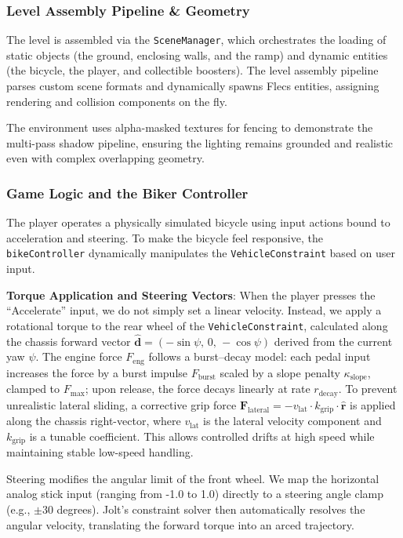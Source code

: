 \documentclass[acmtog, nonacm]{acmart}
\begin{document}
\subsubsection{Level Assembly Pipeline \& Geometry}
The level is assembled via the \texttt{SceneManager}, which orchestrates the loading of static objects (the ground, enclosing walls, and the ramp) and dynamic entities (the bicycle, the player, and collectible boosters). The level assembly pipeline parses custom scene formats and dynamically spawns Flecs entities, assigning rendering and collision components on the fly. 

The environment uses alpha-masked textures for fencing to demonstrate the multi-pass shadow pipeline, ensuring the lighting remains grounded and realistic even with complex overlapping geometry.

\subsubsection{Game Logic and the Biker Controller}
The player operates a physically simulated bicycle using input actions bound to acceleration and steering. To make the bicycle feel responsive, the \texttt{bikeController} dynamically manipulates the \texttt{VehicleConstraint} based on user input.

\textbf{Torque Application and Steering Vectors}: When the player presses the ``Accelerate'' input, we do not simply set a linear velocity. Instead, we apply a rotational torque to the rear wheel of the \texttt{VehicleConstraint}, calculated along the chassis forward vector $\hat{\mathbf{d}} = (-\sin\psi,\,0,\,-\cos\psi)$ derived from the current yaw $\psi$. The engine force $F_{\text{eng}}$ follows a burst--decay model: each pedal input increases the force by a burst impulse $F_{\text{burst}}$ scaled by a slope penalty $\kappa_{\text{slope}}$, clamped to $F_{\max}$; upon release, the force decays linearly at rate $r_{\text{decay}}$. To prevent unrealistic lateral sliding, a corrective grip force $\mathbf{F}_{\text{lateral}} = -v_{\text{lat}} \cdot k_{\text{grip}} \cdot \hat{\mathbf{r}}$ is applied along the chassis right-vector, where $v_{\text{lat}}$ is the lateral velocity component and $k_{\text{grip}}$ is a tunable coefficient. This allows controlled drifts at high speed while maintaining stable low-speed handling.

Steering modifies the angular limit of the front wheel. We map the horizontal analog stick input (ranging from -1.0 to 1.0) directly to a steering angle clamp (e.g., $\pm 30$ degrees). Jolt's constraint solver then automatically resolves the angular velocity, translating the forward torque into an arced trajectory.
\end{document}
